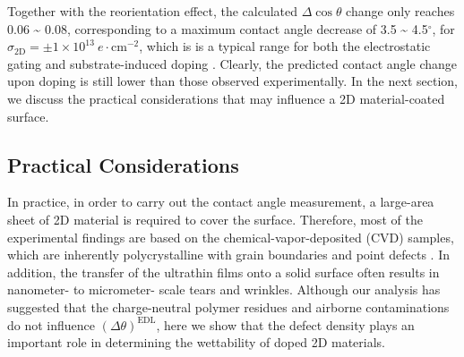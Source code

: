 \documentclass[journal=langd5,manuscript=article,email=true,hyperref=true,keywords=true]{achemso}
\begin{document}
Together with the reorientation effect, the calculated \(\Delta \cos
\theta\) change only reaches 0.06 \textasciitilde{} 0.08, corresponding to a maximum
contact angle decrease of 3.5 \textasciitilde{} 4.5\(^{\circ}\), for
\(\sigma_{\mathrm{2D}}=\pm1\times10^{13}\ e\cdot \mathrm{cm}^{-2}\),
which is is a typical range for both the electrostatic gating
\cite{hong_mechanism_2016} and substrate-induced doping
\cite{ashraf_doping-induced_2016}. Clearly, the predicted contact angle
change upon doping is still lower than those observed
experimentally. In the next section, we discuss the practical
considerations that may influence a 2D material-coated surface.


\subsection{Practical Considerations}
\label{sec:orgb997597}

In practice, in order to
carry out the contact angle measurement, a large-area sheet of 2D
material is required to cover the surface. Therefore, most of the
experimental findings are based on the chemical-vapor-deposited (CVD)
samples, which are inherently polycrystalline with grain boundaries
and point defects \cite{Banhart_2011_defect}.  In addition, the transfer
of the ultrathin films onto a solid surface often results in
nanometer- to micrometer- scale tears and wrinkles. Although our
analysis has suggested that the charge-neutral polymer residues and
airborne contaminations do not influence \((\Delta
\theta)^{\mathrm{EDL}}\), here we show that the defect density plays an
important role in determining the wettability of doped 2D
materials.
\end{document}
